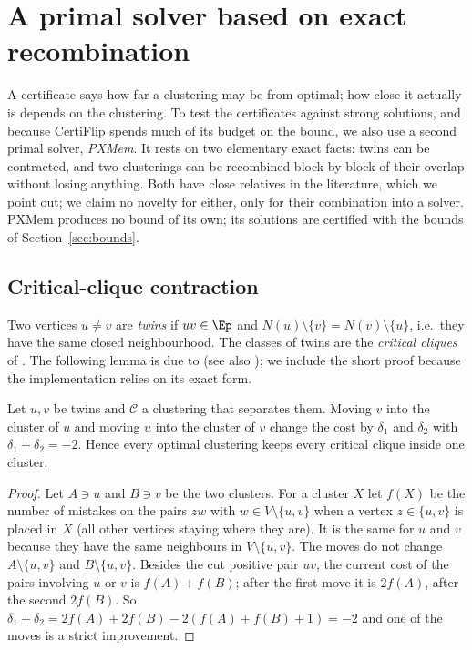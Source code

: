 \section{A primal solver based on exact recombination}\label{sec:primal}

A certificate says how far a clustering may be from optimal; how close it
actually is depends on the clustering.  To test the certificates against
strong solutions, and because CertiFlip spends much of its budget on the
bound, we also use a second primal solver, \emph{PXMem}.  It rests on two
elementary exact facts: twins can be contracted, and two clusterings can be
recombined block by block of their overlap without losing anything.  Both have
close relatives in the literature, which we point out; we claim no novelty for
either, only for their combination into a solver.  PXMem produces no bound of
its own; its solutions are certified with the bounds of
Section~\ref{sec:bounds}.

\subsection{Critical-clique contraction}

Two vertices $u\ne v$ are \emph{twins} if $uv\in\Ep$ and $N(u)\setminus\{v\}=
N(v)\setminus\{u\}$, i.e.\ they have the same closed neighbourhood.  The classes
of twins are the \emph{critical cliques} of \citet{Guo09kernel}.  The
following lemma is due to \citet{Guo09kernel} (see also
\citet{ProttiDS09modular}); we include the short proof because the
implementation relies on its exact form.

\begin{lemma}\label{lem:twins}
Let $u,v$ be twins and $\mathcal C$ a clustering that separates them.  Moving
$v$ into the cluster of $u$ and moving $u$ into the cluster of $v$ change the
cost by $\delta_1$ and $\delta_2$ with $\delta_1+\delta_2=-2$.  Hence every
optimal clustering keeps every critical clique inside one cluster.
\end{lemma}
\begin{proof}
Let $A\ni u$ and $B\ni v$ be the two clusters.  For a cluster $X$ let
$f(X)$ be the number of mistakes on the pairs $zw$ with $w\in
V\setminus\{u,v\}$ when a vertex $z\in\{u,v\}$ is placed in $X$ (all other
vertices staying where they are).  It is the same for $u$ and $v$ because
they have the same neighbours in $V\setminus\{u,v\}$.  The moves do not change
$A\setminus\{u,v\}$ and $B\setminus\{u,v\}$.  Besides the cut positive pair $uv$,
the current cost of the pairs involving $u$ or $v$ is $f(A)+f(B)$; after the
first move it is $2f(A)$, after the second $2f(B)$.  So $\delta_1+\delta_2=2f(A)+2f(B)
-2(f(A)+f(B)+1)=-2$ and one of the moves is a strict improvement.
\end{proof}

